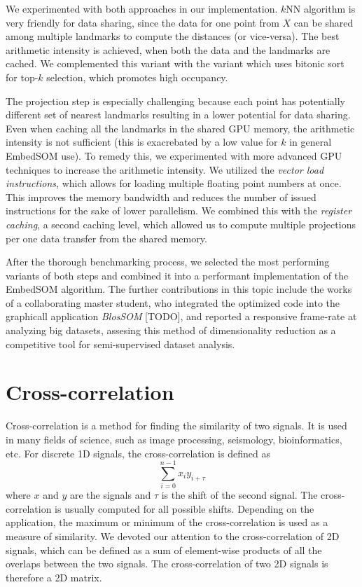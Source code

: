 We experimented with both approaches in our implementation. $k$NN algorithm is very friendly for data sharing, since the data for one point from $X$ can be shared among multiple landmarks to compute the distances (or vice-versa). The best arithmetic intensity is achieved, when both the data and the landmarks are cached. We complemented this variant with the variant which uses bitonic sort for top-$k$ selection, which promotes high occupancy.

The projection step is especially challenging because each point has potentially different set of nearest landmarks resulting in a lower potential for data sharing. Even when caching all the landmarks in the shared GPU memory, the arithmetic intensity is not sufficient (this is exacrebated by a low value for $k$ in general EmbedSOM use). To remedy this, we experimented with more advanced GPU techniques to increase the arithmetic intensity. We utilized the \emph{vector load instructions}, which allows for loading multiple floating point numbers at once. This improves the memory bandwidth and reduces the number of issued instructions for the sake of lower parallelism. We combined this with the \emph{register caching}, a second caching level, which allowed us to compute multiple projections per one data transfer from the shared memory. 

After the thorough benchmarking process, we selected the most performing variants of both steps and combined it into a performant implementation of the EmbedSOM algorithm. The further contributions in this topic include the works of a collaborating master student, who integrated the optimized code into the graphicall application \emph{BlosSOM} [TODO], and reported a responsive frame-rate at analyzing big datasets, assesing this method of dimensionality reduction as a competitive tool for semi-supervised dataset analysis.



\section{Cross-correlation}

Cross-correlation is a method for finding the similarity of two signals. It is used in many fields of science, such as image processing, seismology, bioinformatics, etc. For discrete 1D signals, the cross-correlation is defined as
$$ \sum_{i=0}^{n-1} x_i y_{i + \tau} $$
where $x$ and $y$ are the signals and $\tau$ is the shift of the second signal. The cross-correlation is usually computed for all possible shifts. Depending on the application, the maximum or minimum of the cross-correlation is used as a measure of similarity.
We devoted our attention to the cross-correlation of 2D signals, which can be defined as a sum of element-wise products of all the overlaps between the two signals. The cross-correlation of two 2D signals is therefore a 2D matrix.

